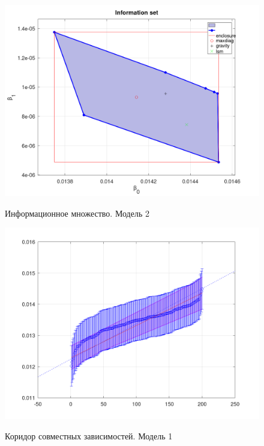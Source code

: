 \begin{figure}[H]
	\begin{center}
		\includegraphics[scale=0.32]{info_set_full_2}
		\label{pic:infoset2}
		\caption{Информационное множество. Модель 2}
	\end{center}
\end{figure}

\begin{figure}[H]
	\begin{center}
		\includegraphics[scale=0.32]{joint_depth_1}
		\label{pic:joint_depth1}
		\caption{Коридор совместных зависимостей. Модель 1}
	\end{center}
\end{figure}

